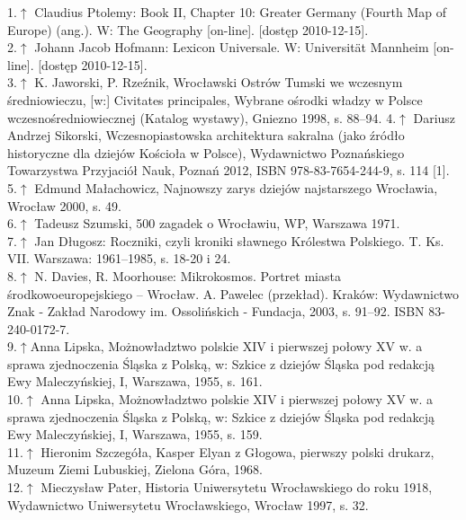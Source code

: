 \documentclass{article}
\begin{document}
1.\hyperref[11]{$\uparrow$} Claudius Ptolemy: Book II, Chapter 10: Greater Germany (Fourth Map of Europe) (ang.). W: The Geography [on-line]. [dostęp 2010-12-15].\label{1}\\
2.\hyperref[12]{$\uparrow$} Johann Jacob Hofmann: Lexicon Universale. W: Universität Mannheim [on-line]. [dostęp 2010-12-15].\label{2}\\
3.\hyperref[13]{$\uparrow$}  K. Jaworski, P. Rzeźnik, Wrocławski Ostrów Tumski we wczesnym średniowieczu, [w:] Civitates principales, Wybrane ośrodki władzy w Polsce wczesnośredniowiecznej (Katalog wystawy), Gniezno 1998, s. 88–94.\label{3}
4.\hyperref[14]{$\uparrow$} Dariusz Andrzej Sikorski, Wczesnopiastowska architektura sakralna (jako źródło historyczne dla dziejów Kościoła w Polsce), Wydawnictwo Poznańskiego Towarzystwa Przyjaciół Nauk, Poznań 2012, ISBN 978-83-7654-244-9, s. 114 [1].\label{4}\\
5.\hyperref[15]{$\uparrow$} Edmund Małachowicz, Najnowszy zarys dziejów najstarszego Wrocławia, Wrocław 2000, s. 49.\label{5}\\
6.\hyperref[16]{$\uparrow$} Tadeusz Szumski, 500 zagadek o Wrocławiu, WP, Warszawa 1971.\label{6}\\
7.\hyperref[17]{$\uparrow$} Jan Długosz: Roczniki, czyli kroniki sławnego Królestwa Polskiego. T. Ks. VII. Warszawa: 1961–1985, s. 18-20 i 24.\label{7}\\
8.\hyperref[18]{$\uparrow$} N. Davies, R. Moorhouse: Mikrokosmos. Portret miasta środkowoeuropejskiego – Wrocław. A. Pawelec (przekład). Kraków: Wydawnictwo Znak - Zakład Narodowy im. Ossolińskich - Fundacja, 2003, s. 91–92. ISBN 83-240-0172-7.\label{8}\\
9.\hyperref[19]{$\uparrow$}Anna Lipska, Możnowładztwo polskie XIV i pierwszej połowy XV w. a sprawa zjednoczenia Śląska z Polską, w: Szkice z dziejów Śląska pod redakcją Ewy Maleczyńskiej, I, Warszawa, 1955, s. 161.\label{9}\\
10.\hyperref[110]{$\uparrow$} Anna Lipska, Możnowładztwo polskie XIV i pierwszej połowy XV w. a sprawa zjednoczenia Śląska z Polską, w: Szkice z dziejów Śląska pod redakcją Ewy Maleczyńskiej, I, Warszawa, 1955, s. 159.\label{10}\\
11.\hyperref[111]{$\uparrow$} Hieronim Szczegóła, Kasper Elyan z Głogowa, pierwszy polski drukarz, Muzeum Ziemi Lubuskiej, Zielona Góra, 1968.\label{11}\\
12.\hyperref[112]{$\uparrow$}  Mieczysław Pater, Historia Uniwersytetu Wrocławskiego do roku 1918, Wydawnictwo Uniwersytetu Wrocławskiego, Wrocław 1997, s. 32.\label{12}\\
\end{document}
